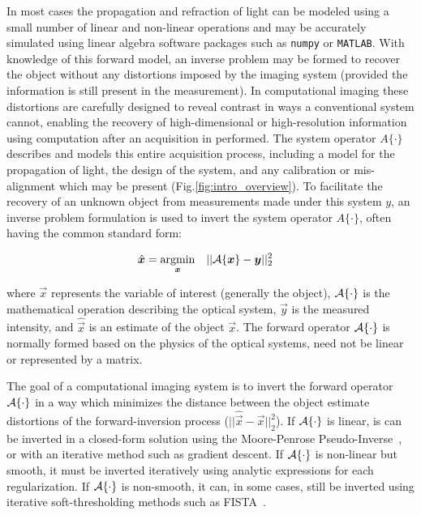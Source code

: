 In most cases the propagation and refraction of light can be modeled using a small number of linear and non-linear operations and may be accurately simulated using linear algebra software packages such as \texttt{numpy} or \texttt{MATLAB}. With knowledge of this forward model, an inverse problem may be formed to recover the object without any distortions imposed by the imaging system (provided the information is still present in the measurement). In computational imaging these distortions are carefully designed to reveal contrast in ways a conventional system cannot, enabling the recovery of high-dimensional or high-resolution information using computation after an acquisition in performed. The system operator $A\{\cdot\}$ describes and models this entire acquisition process, including a model for the propagation of light, the design of the system, and any calibration or mis-alignment which may be present (Fig.\ref{fig:intro_overview}). To facilitate the recovery of an unknown object from measurements made under this system $y$, an inverse problem formulation is used to invert the system operator $A\{\cdot\}$, often having the common standard form:

\begin{equation}\label{eq:intro_inverse_problem}
\begin{aligned}
& \hat{\bm{x}} = \underset{\bm{\bm{x}}}{\text{argmin}}
& & ||\mathcal{A}\{\bm{x}\} - \bm{y} ||_2^2
\end{aligned}
\end{equation}

\noindent where $\vec{x}$ represents the variable of interest (generally the object), $\mathcal{A}\{\cdot\}$ is the mathematical operation describing the optical system, $\vec{y}$ is the measured intensity, and $\hat{\vec{x}}$ is an estimate of the object $\vec{x}$. The forward operator $\mathcal{A}\{\cdot\}$ is normally formed based on the physics of the optical systems, need not be linear or represented by a matrix.

The goal of a computational imaging system is to invert the forward operator $\mathcal{A}\{\cdot\}$ in a way which minimizes the distance between the object estimate distortions of the forward-inversion process ($||\hat{\vec{x}} - \vec{x}||_2^2$). If $\mathcal{A}\{\cdot\}$ is linear, is can be inverted in a closed-form solution using the Moore-Penrose Pseudo-Inverse~\cite{moore1920reciprocal}, or with an iterative method such as gradient descent. If $\mathcal{A}\{\cdot\}$ is non-linear but smooth, it must be inverted iteratively using analytic expressions for each regularization. If $\mathcal{A}\{\cdot\}$ is non-smooth, it can, in some cases, still be inverted using iterative soft-thresholding methods such as FISTA~\cite{beck2009fast}.

